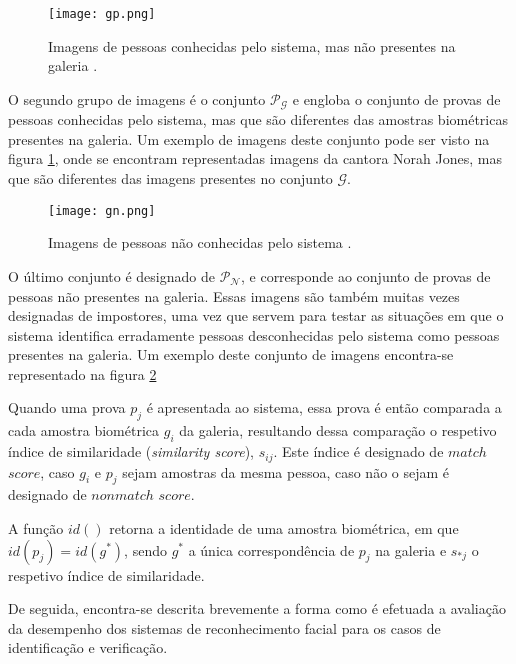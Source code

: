 \begin{figure}[ht]
  \begin{center}
    \leavevmode
    \texttt{[image: gp.png]}
    \caption{Imagens de pessoas conhecidas pelo sistema, mas não presentes na galeria \cite{UniversityofMassachussets}.}	
    \label{fig:gp}
  \end{center}
\end{figure}
O segundo grupo de imagens é o conjunto $\mathscr{P}_\mathscr{G}$ e engloba o conjunto de provas de pessoas conhecidas pelo sistema, mas que são diferentes das amostras biométricas presentes na galeria. Um exemplo de imagens deste conjunto pode ser visto na figura \ref{fig:gp}, onde se encontram representadas imagens da cantora Norah Jones, mas que são diferentes das imagens presentes no conjunto $\mathscr{G}$.

\begin{figure}[ht]
  \begin{center}
    \leavevmode
    \texttt{[image: gn.png]}
    \caption{Imagens de pessoas não conhecidas pelo sistema \cite{UniversityofMassachussets}.}	
    \label{fig:gn}
  \end{center}
\end{figure}
O último conjunto é designado de $\mathscr{P}_\mathscr{N}$, e corresponde ao conjunto de provas de pessoas não presentes na galeria. Essas imagens são também muitas vezes designadas de impostores, uma vez que servem para testar as situações em que o sistema identifica erradamente pessoas desconhecidas pelo sistema como pessoas presentes na galeria. Um exemplo deste conjunto de imagens encontra-se representado na figura \ref{fig:gn}

Quando uma prova $p_j$ é apresentada ao sistema, essa prova é então comparada a cada amostra biométrica $g_i$ da galeria, resultando dessa comparação o respetivo índice de similaridade (\textit{similarity score}), $s_{ij}$. Este índice é designado de $match$ $score$, caso $g_i$ e $p_j$ sejam amostras da mesma pessoa, caso não o sejam é designado de $nonmatch$ $score$.

A função $id()$ retorna a identidade de uma amostra biométrica, em que $id(p_j) = id(g^*)$, sendo $g^*$ a única correspondência de $p_j$ na galeria e $s_{*j}$ o respetivo índice de similaridade.

De seguida, encontra-se descrita brevemente a forma como é efetuada a avaliação da desempenho dos sistemas de reconhecimento facial para os casos de identificação e verificação.

